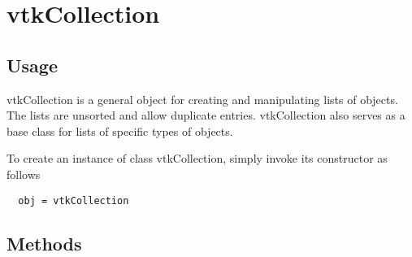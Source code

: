 \section{vtkCollection}

\subsection{Usage}

 vtkCollection is a general object for creating and manipulating lists
 of objects. The lists are unsorted and allow duplicate entries. 
 vtkCollection also serves as a base class for lists of specific types 
 of objects.

To create an instance of class vtkCollection, simply
invoke its constructor as follows
\begin{verbatim}
  obj = vtkCollection
\end{verbatim}
\subsection{Methods}


